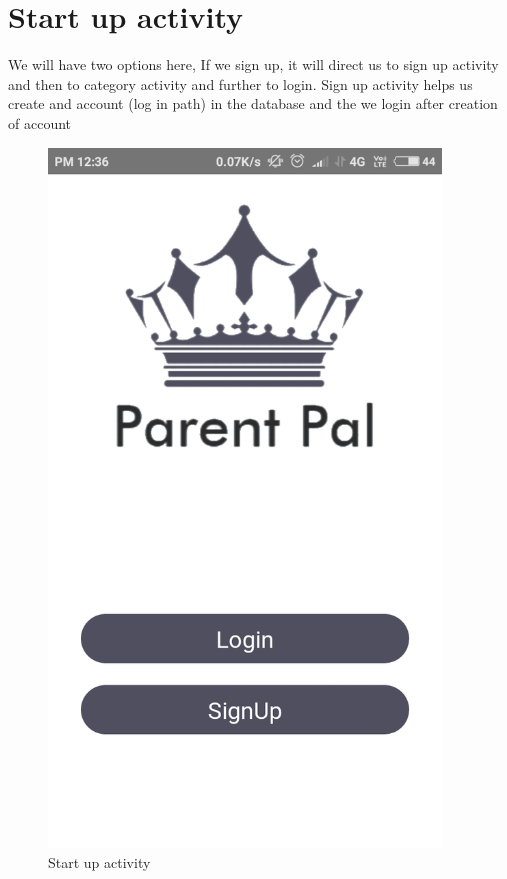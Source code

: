 \section{Start up activity}
We will have two options here, If we sign up, it will direct us to sign up activity and then to category activity and further to login. Sign up activity helps us create and account (log in path) in the database and the we login after creation of account
\vspace{2cm}
\begin{figure}[!h]
	\centering
	\includegraphics[height=7.3in]{Startup.PNG}
	\caption{Start up activity}
\end{figure}
\newpage

